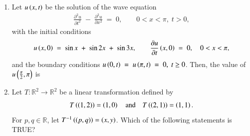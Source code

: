 \documentclass[journal,12pt,onecolumn]{IEEEtran}
\theoremstyle{remark}
\begin{document}
\begin{enumerate}
\begin{enumerate}
\end{enumerate}
\newpage
\item Let $u\left(x,t\right)$ be the solution of the wave equation
\begin{align*}
\frac{\partial^{2}u}{\partial t^{2}} \;-\; \frac{\partial^{2}u}{\partial x^{2}} \;=\; 0,\qquad 0 < x < \pi,\; t>0,
\end{align*}
with the initial conditions
\begin{align*}
u\left(x,0\right) \;=\; \sin x \;+\; \sin 2x \;+\; \sin 3x,\qquad
\frac{\partial u}{\partial t}\left(x,0\right) \;=\; 0,\quad 0 < x < \pi,
\end{align*}
and the boundary conditions $u\left(0,t\right) \;=\; u\left(\pi,t\right) \;=\; 0,\; t \ge 0$. Then, the value of $u\left(\tfrac{\pi}{2}, \pi\right)$ is

\hfill{}


\begin{enumerate}
\end{enumerate}

\item Let $T \colon \mathbb{R}^{2} \to \mathbb{R}^{2}$ be a linear transformation defined by
\begin{align*}
T\left(\left(1,2\right)\right) = \left(1,0\right) \quad \text{and} \quad T\left(\left(2,1\right)\right) = \left(1,1\right).
\end{align*}
For $p,q \in \mathbb{R}$, let $T^{-1}\left(\left(p,q\right)\right) = \left(x,y\right)$. Which of the following statements is TRUE?

\hfill{}

\begin{enumerate}
\end{enumerate}


\end{enumerate}
\end{document}
